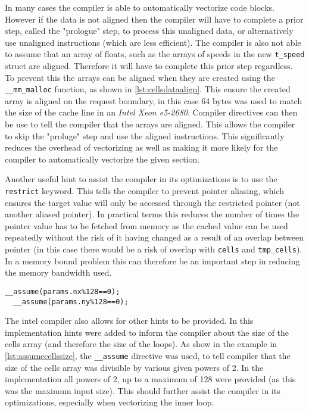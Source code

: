 \documentclass{article}
\begin{document}
\begin{multicols}{2}
In many cases the compiler is able to automatically vectorize code blocks.
However if the data is not aligned then the compiler will have to complete a prior
step, called the "prologue"\cite{vsaac} step, to process this unaligned data, or
alternatively use unaligned instructions (which are less efficient). The
compiler is also not able to assume that an array of floats, such as the arrays
of speeds in the new \verb|t_speed| struct are aligned. Therefore it will have
to complete this prior step regardless. To prevent this the arrays can be
aligned when they are created using the \verb|__mm_malloc| function, as shown in \autoref{lst:cellsdataalign}. This
ensure the created array is aligned on the request boundary, in this case 64
bytes was used to match the size of the cache line in an \emph{Intel Xeon
e5-2680}. Compiler directives can then be use to tell the compiler that the arrays
are aligned. This allows the compiler to skip the "proluge" step and use the
aligned instructions. This significantly reduces the overhead of vectorizing as
well as making it more likely for the compiler to automatically vectorize the
given section.

Another useful hint to assist the compiler in its optimizations is to use the
\verb|restrict| keyword. This tells the compiler to prevent pointer aliasing,
which ensures the target value will only be accessed through the restricted
pointer (not another aliased pointer). In practical terms this reduces the
number of times the pointer value has to be fetched from memory as the cached
value can be used repeatedly without the risk of it having changed as a result
of an overlap between pointer (in this case there would be a risk of overlap
with \verb|cells| and \verb|tmp_cells|). In a memory bound problem this can
therefore be an important step in reducing the memory bandwidth used.

\begin{lstlisting}[style=CStyle, label={lst:assumecellssize}, caption={Additional compiler hints},]
  __assume(params.nx%128==0);
  __assume(params.ny%128==0);
\end{lstlisting}

The intel compiler also allows for other hints to be provided. In this
implementation hints were added to inform the compiler about the size of the
cells array (and therefore the size of the loops). As show in the example in
\autoref{lst:assumecellssize}, the \verb|__assume| directive was used, to tell
compiler that the size of the cells array was divisible by various given powers of 2.
In the implementation all powers of 2, up to a maximum of 128 were provided (as
this was the maximum input size). This should further assist the compiler in
its optimizations, especially when vectorizing the inner loop.


\end{multicols}
\end{document}
